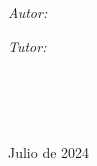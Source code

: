 \graphicspath{{./front-page/figures/}}
\begin{titlepage}
\begin{center}

\vfill
{\scshape\LARGE \univname\par}\vspace{0.3cm} %
\textsc{\Large \facultyname}\\[0.3cm] %
\Large \worktype\\ [0.2cm]

\HRule \\[0.4cm] %
{\Large \bfseries \ttitle\par}\vspace{0.4cm} %
\HRule \\[0.5cm] %

\begin{minipage}[t]{0.4\textwidth}
\begin{flushleft} \large
\emph{Autor:}\\
\authorname %
\end{flushleft}
\end{minipage}
\begin{minipage}[t]{0.4\textwidth}
\begin{flushright} \large
\emph{Tutor:} \\
\supname %
\end{flushright}
\end{minipage}\\[1.5cm]

\vfill


\large
\deptname\\[0cm] %
\institutename\\[0cm] %


{\large Julio de 2024}\\[4cm] %

\vfill
\end{center}
\end{titlepage}
